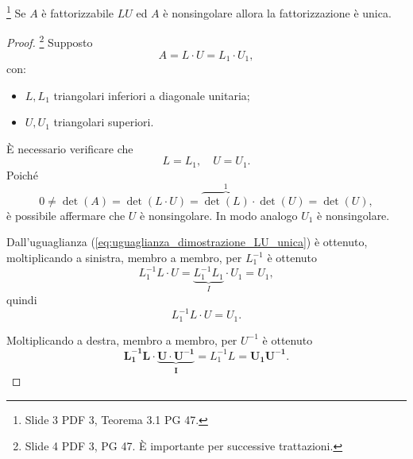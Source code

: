 \begin{theorem}\footnote{Slide 3 PDF 3, Teorema 3.1 PG 47.}\label{th:unicita_fattorizzazione_LU}
    Se $A$ è fattorizzabile $LU$ ed $A$ è \gls{nonsingolare} allora la fattorizzazione è unica. 
\end{theorem}
\begin{proof}
    \footnote{Slide 4 PDF 3, PG 47. È importante per successive trattazioni.} Supposto
    \begin{equation}\label{eq:uguaglianza_dimostrazione_LU_unica}
    	A=L\cdot U = L_1\cdot U_1,
    \end{equation}
     con:
    \begin{itemize}
        \item $L, L_1$ triangolari inferiori a diagonale unitaria;
        \item $U, U_1$ triangolari superiori.
    \end{itemize}
    È necessario verificare che
    \begin{equation*}
        L=L_1,\quad U=U_1.
    \end{equation*}
    Poiché
    \begin{equation*}
        0\neq\det(A)=\det(L\cdot U)= \overbrace{\det(L)}^{1}\cdot \det(U)=\det(U),
    \end{equation*}
    è possibile affermare che $U$ è \gls{nonsingolare}. In modo analogo $U_1$ è \gls{nonsingolare}.

    \noindent Dall'uguaglianza (\ref{eq:uguaglianza_dimostrazione_LU_unica}) è ottenuto, moltiplicando a sinistra, membro a membro, per $L_1^{-1}$ è ottenuto
    \begin{equation*}
        L_1^{-1}L\cdot U= \underbrace{L_1^{-1}L_1}_{I}\cdot U_1 = U_1,
    \end{equation*}
    quindi
    \begin{equation*}
    	L_1^{-1}L\cdot U= U_1.
    \end{equation*}

    \noindent Moltiplicando a destra, membro a membro, per $U^{-1}$ è ottenuto
    \begin{equation*}
    	\boldsymbol{L_1^{-1}L\cdot \underbrace{U\cdot U^{-1}}_I}=L_1^{-1}L\boldsymbol{=U_1U^{-1}}.
    \end{equation*}
    

\end{proof}
